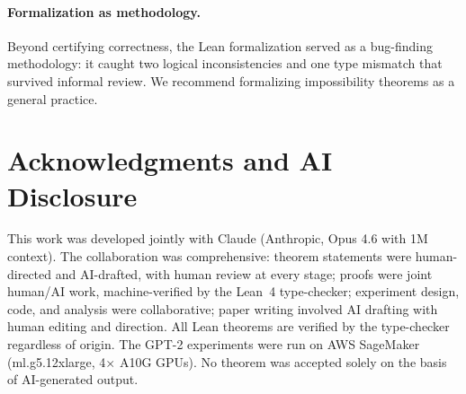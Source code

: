 \documentclass{jmlr}
\begin{document}
\paragraph{Formalization as methodology.}
Beyond certifying correctness, the Lean formalization served as a bug-finding methodology: it caught two logical inconsistencies and one type mismatch that survived informal review. We recommend formalizing impossibility theorems as a general practice.

\section*{Acknowledgments and AI Disclosure}
This work was developed jointly with Claude (Anthropic, Opus 4.6 with 1M context). The collaboration was comprehensive: theorem statements were human-directed and AI-drafted, with human review at every stage; proofs were joint human/AI work, machine-verified by the Lean~4 type-checker; experiment design, code, and analysis were collaborative; paper writing involved AI drafting with human editing and direction. All Lean theorems are verified by the type-checker regardless of origin. The GPT-2 experiments were run on AWS SageMaker (ml.g5.12xlarge, 4$\times$ A10G GPUs). No theorem was accepted solely on the basis of AI-generated output.


\end{document}
